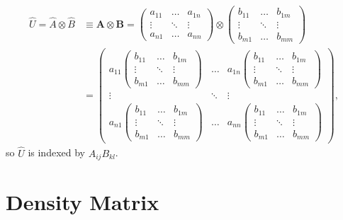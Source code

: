 \begin{align*}
    \hat{U} = 
    \hat{A}\otimes\hat{B} & \equiv \mathbf{A}\otimes\mathbf{B} = 
    \begin{pmatrix}
        a_{11} & \ldots & a_{1n} \\
        \vdots & \ddots & \vdots\\
        a_{n1} & \ldots & a_{nn}
    \end{pmatrix}
    \otimes
    \begin{pmatrix}
        b_{11} & \ldots & b_{1m} \\
        \vdots & \ddots & \vdots\\
        b_{m1} & \ldots & b_{mm}
    \end{pmatrix}\\
    &=
    \begin{pmatrix}
        a_{11} \begin{pmatrix}
        b_{11} & \ldots & b_{1m} \\
        \vdots & \ddots & \vdots\\
        b_{m1} & \ldots & b_{mm}
    \end{pmatrix} & \ldots & a_{1n} \begin{pmatrix}
        b_{11} & \ldots & b_{1m} \\
        \vdots & \ddots & \vdots\\
        b_{m1} & \ldots & b_{mm}
    \end{pmatrix}\\
        \vdots & \ddots & \vdots\\
        a_{n1} \begin{pmatrix}
        b_{11} & \ldots & b_{1m} \\
        \vdots & \ddots & \vdots\\
        b_{m1} & \ldots & b_{mm}
    \end{pmatrix}& \ldots & a_{nn}\begin{pmatrix}
        b_{11} & \ldots & b_{1m} \\
        \vdots & \ddots & \vdots\\
        b_{m1} & \ldots & b_{mm}
    \end{pmatrix}
    \end{pmatrix},
\end{align*}
so $\hat{U}$ is indexed by $A_{ij}B_{kl}$.

\section{Density Matrix}\label{sec:density_matrix}

